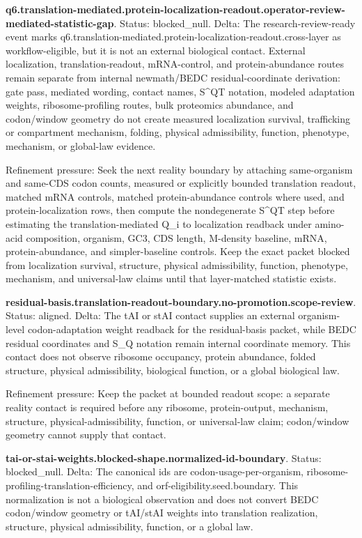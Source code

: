 \textbf{q6.translation-mediated.protein-localization-readout.operator-review-mediated-statistic-gap}. Status: blocked\_null. Delta: The research-review-ready event marks q6.translation-mediated.protein-localization-readout.cross-layer as workflow-eligible, but it is not an external biological contact. External localization, translation-readout, mRNA-control, and protein-abundance routes remain separate from internal newmath/BEDC residual-coordinate derivation: gate pass, mediated wording, contact names, S\textasciicircum{}QT notation, modeled adaptation weights, ribosome-profiling routes, bulk proteomics abundance, and codon/window geometry do not create measured localization survival, trafficking or compartment mechanism, folding, physical admissibility, function, phenotype, mechanism, or global-law evidence.

Refinement pressure: Seek the next reality boundary by attaching same-organism and same-CDS codon counts, measured or explicitly bounded translation readout, matched mRNA controls, matched protein-abundance controls where used, and protein-localization rows, then compute the nondegenerate S\textasciicircum{}QT step before estimating the translation-mediated Q\_i to localization readback under amino-acid composition, organism, GC3, CDS length, M-density baseline, mRNA, protein-abundance, and simpler-baseline controls. Keep the exact packet blocked from localization survival, structure, physical admissibility, function, phenotype, mechanism, and universal-law claims until that layer-matched statistic exists.

\textbf{residual-basis.translation-readout-boundary.no-promotion.scope-review}. Status: aligned. Delta: The tAI or stAI contact supplies an external organism-level codon-adaptation weight readback for the residual-basis packet, while BEDC residual coordinates and S\_Q notation remain internal coordinate memory. This contact does not observe ribosome occupancy, protein abundance, folded structure, physical admissibility, biological function, or a global biological law.

Refinement pressure: Keep the packet at bounded readout scope: a separate reality contact is required before any ribosome, protein-output, mechanism, structure, physical-admissibility, function, or universal-law claim; codon/window geometry cannot supply that contact.

\textbf{tai-or-stai-weights.blocked-shape.normalized-id-boundary}. Status: blocked\_null. Delta: The canonical ids are codon-usage-per-organism, ribosome-profiling-translation-efficiency, and orf-eligibility.seed.boundary. This normalization is not a biological observation and does not convert BEDC codon/window geometry or tAI/stAI weights into translation realization, structure, physical admissibility, function, or a global law.

